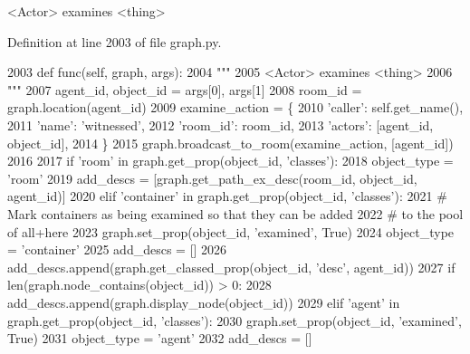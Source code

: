 \begin{DoxyVerb}<Actor> examines <thing>
\end{DoxyVerb}
 

Definition at line 2003 of file graph.\+py.


\begin{DoxyCode}
2003     \textcolor{keyword}{def }func(self, graph, args):
2004         \textcolor{stringliteral}{"""}
2005 \textcolor{stringliteral}{        <Actor> examines <thing>}
2006 \textcolor{stringliteral}{        """}
2007         agent\_id, object\_id = args[0], args[1]
2008         room\_id = graph.location(agent\_id)
2009         examine\_action = \{
2010             \textcolor{stringliteral}{'caller'}: self.get\_name(),
2011             \textcolor{stringliteral}{'name'}: \textcolor{stringliteral}{'witnessed'},
2012             \textcolor{stringliteral}{'room\_id'}: room\_id,
2013             \textcolor{stringliteral}{'actors'}: [agent\_id, object\_id],
2014         \}
2015         graph.broadcast\_to\_room(examine\_action, [agent\_id])
2016 
2017         \textcolor{keywordflow}{if} \textcolor{stringliteral}{'room'} \textcolor{keywordflow}{in} graph.get\_prop(object\_id, \textcolor{stringliteral}{'classes'}):
2018             object\_type = \textcolor{stringliteral}{'room'}
2019             add\_descs = [graph.get\_path\_ex\_desc(room\_id, object\_id, agent\_id)]
2020         \textcolor{keywordflow}{elif} \textcolor{stringliteral}{'container'} \textcolor{keywordflow}{in} graph.get\_prop(object\_id, \textcolor{stringliteral}{'classes'}):
2021             \textcolor{comment}{# Mark containers as being examined so that they can be added}
2022             \textcolor{comment}{# to the pool of all+here}
2023             graph.set\_prop(object\_id, \textcolor{stringliteral}{'examined'}, \textcolor{keyword}{True})
2024             object\_type = \textcolor{stringliteral}{'container'}
2025             add\_descs = []
2026             add\_descs.append(graph.get\_classed\_prop(object\_id, \textcolor{stringliteral}{'desc'}, agent\_id))
2027             \textcolor{keywordflow}{if} len(graph.node\_contains(object\_id)) > 0:
2028                 add\_descs.append(graph.display\_node(object\_id))
2029         \textcolor{keywordflow}{elif} \textcolor{stringliteral}{'agent'} \textcolor{keywordflow}{in} graph.get\_prop(object\_id, \textcolor{stringliteral}{'classes'}):
2030             graph.set\_prop(object\_id, \textcolor{stringliteral}{'examined'}, \textcolor{keyword}{True})
2031             object\_type = \textcolor{stringliteral}{'agent'}
2032             add\_descs = []

\end{DoxyCode}
